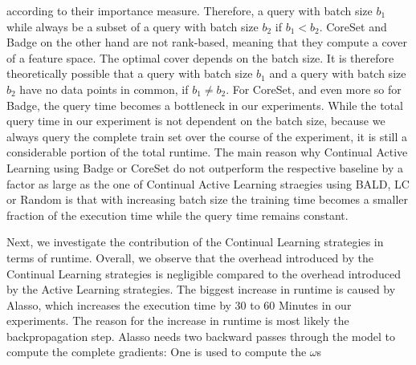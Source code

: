 according to their importance measure. Therefore, a query with batch size $b_1$ while always be a subset of a query with batch size $b_2$ if $b_1 < b_2$. CoreSet and Badge on the other hand are not rank-based, meaning that they compute a cover of a feature space. The
optimal cover depends on the batch size. It is therefore theoretically possible that a query with batch size $b_1$ and a query with batch size $b_2$ have no data points in common, if $b_1 \neq b_2$. For CoreSet, and even more so for Badge, the query time becomes a
bottleneck in our experiments. While the total query time in our experiment is not dependent on the batch size, because we always query the complete train set over the course of the experiment, it is still a considerable portion of the total runtime. The main reason why
Continual Active Learning using Badge or CoreSet do not outperform the respective baseline by a factor as large as the one of Continual Active Learning straegies using BALD, LC or Random is that with increasing batch size the training time becomes a smaller fraction of
the execution time while the query time remains constant. \par
Next, we investigate the contribution of the Continual Learning strategies in terms of runtime. Overall, we observe that the overhead introduced by the Continual Learning strategies is negligible compared to the overhead introduced by the Active Learning strategies. The
biggest increase in runtime is caused by Alasso, which increases the execution time by 30 to 60 Minutes in our experiments. The reason for the increase in runtime is most likely the backpropagation step. Alasso needs two backward passes through the model to compute the
complete gradients: One is used to compute the $\omega$s



